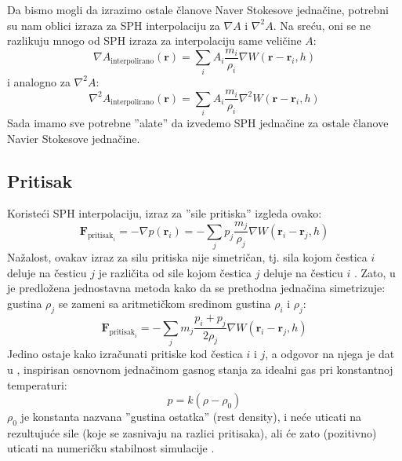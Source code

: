 \documentclass[12pt]{article}
\renewcommand{\vec}[1]{\mathbf{#1}}
\begin{document}
    Da bismo mogli da izrazimo ostale \v clanove Naver Stokesove jedna\v cine, potrebni su nam oblici izraza za SPH interpolaciju za $\nabla A$ i $\nabla^2 A$. Na sre\'cu, oni se ne razlikuju mnogo od SPH izraza za interpolaciju same veli\v cine $A$:
    \begin{equation}\label{eq:SPH interpolacija gradijenta}
    \nabla A_\text{interpolirano}(\vec{r}) = \sum_i{A_i \frac{m_i}{\rho_i} \nabla W(\vec{r}-\vec{r}_i, h)}
    \end{equation}
    i analogno za $\nabla^2 A$:
    \begin{equation}\label{eq:SPH interpolacija Laplasovog operatora}
    \nabla^2 A_\text{interpolirano}(\vec{r}) = \sum_i{A_i \frac{m_i}{\rho_i} \nabla^2 W(\vec{r}-\vec{r}_i, h)}
    \end{equation}
    Sada imamo sve potrebne ''alate'' da izvedemo SPH jedna\v cine za ostale \v clanove Navier Stokesove jedna\v cine.
    \subsection{Pritisak}
        Koriste\'ci SPH interpolaciju, izraz za ''sile pritiska'' izgleda ovako:
        \begin{equation}\label{eq:SPH interpolacija sile pritiska (original)}
        \vec{F}_{\text{pritisak}_i} = -\nabla p(\vec{r}_i)=-\sum_j p_j \frac{m_j}{\rho_j}\nabla W(\vec{r}_i-\vec{r}_j, h)
        \end{equation}
        Na\v zalost, ovakav izraz za silu pritiska nije simetri\v can, tj. sila kojom \v cestica $i$ deluje na \v cesticu $j$ je razli\v cita od sile kojom \v cestica $j$ deluje na \v cesticu $i$ . Zato, u \cite{Desbrun96smoothedparticles:} je predlo\v zena jednostavna metoda kako da se prethodna jedna\v cina simetrizuje: gustina $\rho_j$ se zameni sa aritmeti\v ckom sredinom gustina $\rho_i$ i $\rho_j$:
        \begin{equation}\label{eq:SPH interpolacija sile pritiska (simetricno)}
        \vec{F}_{\text{pritisak}_i} = -\sum_j m_j \frac{p_i+p_j}{2\rho_j}\nabla W(\vec{r}_i-\vec{r}_j, h)
        \end{equation}
        Jedino ostaje kako izra\v cunati pritiske kod \v cestica $i$ i $j$, a odgovor na njega je dat u \cite{Muller:2003:PFS:846276.846298}, inspirisan osnovnom jedna\v cinom gasnog stanja za idealni gas pri konstantnoj temperaturi:
        \begin{equation}\label{eq:SPH racunanje pritiska}
        p = k(\rho-\rho_0)
        \end{equation}
        $\rho_0$ je konstanta nazvana ''gustina ostatka'' (rest density), i ne\'ce uticati na rezultuju\'ce sile (koje se zasnivaju na razlici pritisaka), ali \'ce zato (pozitivno) uticati na numeri\v cku stabilnost simulacije \cite{Muller:2003:PFS:846276.846298}.
\end{document}
